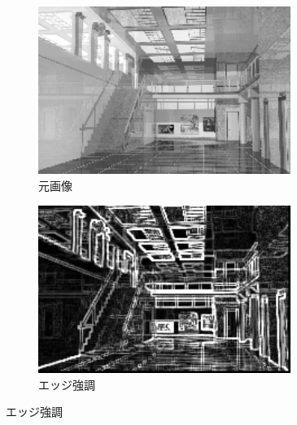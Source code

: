 \documentclass[a4paper,12pt]{jsarticle}
\begin{document}
\begin{figure}[!htbp]
\centering
\begin{subfigure}[b]{0.45\textwidth}
    \centering
    \includegraphics[width=0.9\textwidth]{./sampleimages/sample4.png}
    \caption{元画像}
\end{subfigure}
\hfill
\begin{subfigure}[b]{0.45\textwidth}
    \centering
    \includegraphics[width=0.9\textwidth]{./images/edge_enhanced_sample4_edge.png}
    \caption{エッジ強調}
\end{subfigure}


\end{figure}
\end{document}
